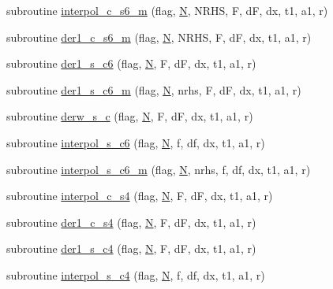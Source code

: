 \begin{DoxyCompactItemize}
\item 
subroutine \hyperlink{ders__n_8f_abd7d46404e91bd0fc87d72b6b90a7122}{interpol\+\_\+c\+\_\+s6\+\_\+m} (flag, \hyperlink{mc__gpu_8cu_ab2b6b0c222cd1ce70d6a831f57241e59}{N}, N\+R\+HS, F, dF, dx, t1, a1, r)
\item 
subroutine \hyperlink{ders__n_8f_aa014445c484a7914447623a186b87c9a}{der1\+\_\+c\+\_\+s6\+\_\+m} (flag, \hyperlink{mc__gpu_8cu_ab2b6b0c222cd1ce70d6a831f57241e59}{N}, N\+R\+HS, F, dF, dx, t1, a1, r)
\item 
subroutine \hyperlink{ders__n_8f_a7ab7acdb9ccb3abe00acc8498c56bc29}{der1\+\_\+s\+\_\+c6} (flag, \hyperlink{mc__gpu_8cu_ab2b6b0c222cd1ce70d6a831f57241e59}{N}, F, dF, dx, t1, a1, r)
\item 
subroutine \hyperlink{ders__n_8f_aea38cda3265a27d6c7509cc8a1d0b864}{der1\+\_\+s\+\_\+c6\+\_\+m} (flag, \hyperlink{mc__gpu_8cu_ab2b6b0c222cd1ce70d6a831f57241e59}{N}, nrhs, F, dF, dx, t1, a1, r)
\item 
subroutine \hyperlink{ders__n_8f_a1c1e557772704039702890857b2e9089}{derw\+\_\+s\+\_\+c} (flag, \hyperlink{mc__gpu_8cu_ab2b6b0c222cd1ce70d6a831f57241e59}{N}, F, dF, dx, t1, a1, r)
\item 
subroutine \hyperlink{ders__n_8f_aa85fcad97cd803e15561b91ddca1e34e}{interpol\+\_\+s\+\_\+c6} (flag, \hyperlink{mc__gpu_8cu_ab2b6b0c222cd1ce70d6a831f57241e59}{N}, f, df, dx, t1, a1, r)
\item 
subroutine \hyperlink{ders__n_8f_a918a09401cafa54f2581d0957ffec441}{interpol\+\_\+s\+\_\+c6\+\_\+m} (flag, \hyperlink{mc__gpu_8cu_ab2b6b0c222cd1ce70d6a831f57241e59}{N}, nrhs, f, df, dx, t1, a1, r)
\item 
subroutine \hyperlink{ders__n_8f_a9e5ab56270084745c29656628a341624}{interpol\+\_\+c\+\_\+s4} (flag, \hyperlink{mc__gpu_8cu_ab2b6b0c222cd1ce70d6a831f57241e59}{N}, F, dF, dx, t1, a1, r)
\item 
subroutine \hyperlink{ders__n_8f_ab061c3c65031a830ee62dd33eed2b1d0}{der1\+\_\+c\+\_\+s4} (flag, \hyperlink{mc__gpu_8cu_ab2b6b0c222cd1ce70d6a831f57241e59}{N}, F, dF, dx, t1, a1, r)
\item 
subroutine \hyperlink{ders__n_8f_ae9bf22bd0ab8ba9d56f086eac5a3af30}{der1\+\_\+s\+\_\+c4} (flag, \hyperlink{mc__gpu_8cu_ab2b6b0c222cd1ce70d6a831f57241e59}{N}, F, dF, dx, t1, a1, r)
\item 
subroutine \hyperlink{ders__n_8f_acc3677e674af0677ddcebe275095f2ba}{interpol\+\_\+s\+\_\+c4} (flag, \hyperlink{mc__gpu_8cu_ab2b6b0c222cd1ce70d6a831f57241e59}{N}, f, df, dx, t1, a1, r)
\item 

\end{DoxyCompactItemize}
